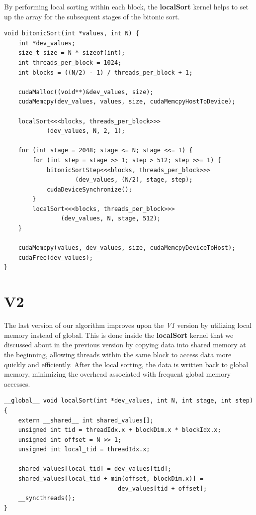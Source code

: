 \documentclass[12pt]{report}
\begin{document}
By performing local sorting within each block, the \textbf{localSort} kernel helps to set up the array for the subsequent stages of the bitonic sort.

\begin{lstlisting}[style=cppstyle]
void bitonicSort(int *values, int N) {
    int *dev_values;
    size_t size = N * sizeof(int);
    int threads_per_block = 1024;
    int blocks = ((N/2) - 1) / threads_per_block + 1;

    cudaMalloc((void**)&dev_values, size);
    cudaMemcpy(dev_values, values, size, cudaMemcpyHostToDevice);

    localSort<<<blocks, threads_per_block>>>
            (dev_values, N, 2, 1);

    for (int stage = 2048; stage <= N; stage <<= 1) {
        for (int step = stage >> 1; step > 512; step >>= 1) {
            bitonicSortStep<<<blocks, threads_per_block>>>
                    (dev_values, (N/2), stage, step);
            cudaDeviceSynchronize();
        }
        localSort<<<blocks, threads_per_block>>>
                (dev_values, N, stage, 512);
    }    

    cudaMemcpy(values, dev_values, size, cudaMemcpyDeviceToHost);
    cudaFree(dev_values);
}
\end{lstlisting}

\newpage
\section{V2}
The last version of our algorithm improves upon the \textit{V1} version by utilizing local memory instead of global. This is done inside the \textbf{localSort} kernel that we discussed about in the previous version by copying data into shared memory at the beginning, allowing threads within the same block to access data more quickly and efficiently. After the local sorting, the data is written back to global memory, minimizing the overhead associated with frequent global memory accesses.
\begin{lstlisting}[style=cppstyle]
__global__ void localSort(int *dev_values, int N, int stage, int step) {
    extern __shared__ int shared_values[];
    unsigned int tid = threadIdx.x + blockDim.x * blockIdx.x;
    unsigned int offset = N >> 1;
    unsigned int local_tid = threadIdx.x;

    shared_values[local_tid] = dev_values[tid];
    shared_values[local_tid + min(offset, blockDim.x)] = 
                                dev_values[tid + offset];
    __syncthreads();
}
\end{lstlisting}
\end{document}
